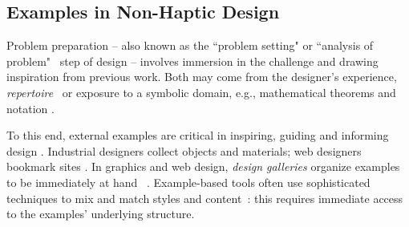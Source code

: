 


\subsection{Examples in Non-Haptic Design}

Problem preparation -- also known as the ``problem setting" \cite{Schon1982} or ``analysis of problem"~\cite{Warr2005}
step of design -- involves 
immersion in the challenge
and drawing inspiration from previous work. %
Both may come from the designer's experience,  \emph{repertoire}~\cite{Schon1982} or exposure to a symbolic domain, e.g., mathematical theorems and notation %
\cite{Csikszentmihalyi1996}.

To this end, external examples are critical in inspiring, guiding and informing design \cite{Herring2009,Buxton2007}. 
Industrial designers collect objects %
and materials; web designers bookmark sites \cite{Herring2009}.
In graphics and web design, \emph{design galleries} organize examples to be  immediately at hand %
~\cite{Lee2010a,Marks1997}.
Example-based tools often use sophisticated techniques to mix and match styles and content~\cite{Kumar2011}: this requires immediate access to the examples' underlying structure.
%

